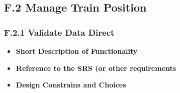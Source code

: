 \documentclass{template/openetcs_article}
\begin{document}
\subsection{F.2 Manage Train Position}

\subsubsection{F.2.1 Validate Data Direct}
\begin{itemize}
	\item \textbf{Short Description of Functionality}\\
	\item \textbf{Reference to the SRS (or other requirements}\\
	\item \textbf{Design Constrains and Choices}\\
\end{itemize}





%
%
%
%



\end{document}
